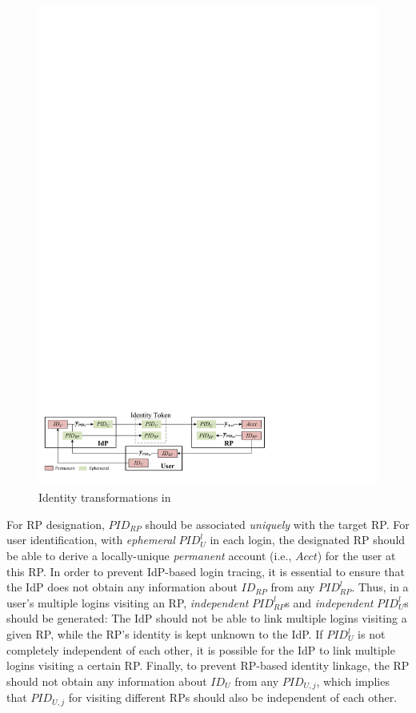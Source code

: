 \begin{figure}[b]
  \centering
  \includegraphics[width=1.00\linewidth]{fig/IDCorrelation.pdf}
  \caption{Identity transformations in \usso} %
  \label{fig:IDCorrelation}
\end{figure}

For RP designation, $PID_{RP}$ should be associated \emph{uniquely} with the target RP.
For user identification, with \emph{ephemeral} $PID_{U}^l$ in each login, the designated RP should be able to derive a locally-unique \emph{permanent} account  (i.e., $Acct$) for the user at this RP.
In order to prevent IdP-based login tracing, it is essential to ensure that the IdP does not obtain any information about $ID_{RP}$ from any $PID_{RP}^l$.
Thus, in a user's multiple logins visiting an RP,
\emph{independent} $PID_{RP}^l$s
and \emph{independent} $PID_U^l$s should be generated:
The IdP should not be able to link multiple logins visiting a given RP, while the RP's identity is kept unknown to the IdP. If $PID_U^l$ is not completely independent of each other, it is possible for the IdP to link multiple logins visiting a certain RP.
Finally, to prevent RP-based identity linkage,
the RP should not obtain any information about $ID_U$ from any $PID_{U,j}$, which implies that $PID_{U,j}$ for visiting different RPs should also be independent of each other.

